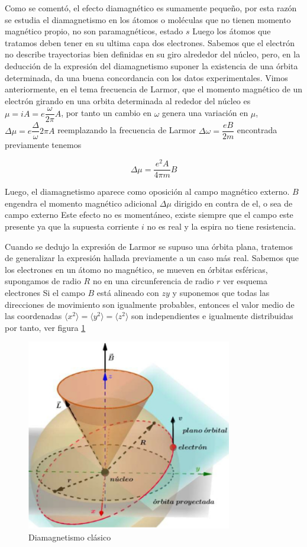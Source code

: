 Como se comentó, el efecto diamagnético es sumamente pequeño, por esta razón se estudia el diamagnetismo en los átomos o moléculas que no tienen momento magnético propio, no son paramagnéticos, estado $s$ Luego los átomos que tratamos deben tener en su ultima capa dos electrones. Sabemos que el electrón no describe trayectorias bien definidas en su giro alrededor del núcleo, pero, en la deducción de la expresión del diamagnetismo suponer la existencia de una órbita determinada, da una buena concordancia con los datos experimentales. Vimos anteriormente, en el tema frecuencia de Larmor, que el momento magnético de un electrón girando en una orbita determinada al rededor del núcleo es $\mu=iA= e\dfrac{\omega}{2\pi}A$, por tanto un cambio en $\omega$ genera una variación en $\mu$, $\Delta\mu=e\dfrac{\Delta}\omega{2\pi}A$ reemplazando la frecuencia de Larmor $\Delta\omega=\dfrac{eB}{2m}$ encontrada previamente tenemos

\begin{equation*}
	\Delta\mu=\dfrac{e^{2}A}{4\pi m}B
\end{equation*}

Luego, el diamagnetismo aparece como oposición al campo magnético externo. $B$ engendra el momento magnético adicional $\Delta\mu$ dirigido en contra de el, o sea de campo externo Este efecto no es momentáneo, existe siempre que el campo este presente ya que la supuesta corriente $i$ no es real y la espira no tiene resistencia.

Cuando se dedujo la expresión de Larmor se supuso una órbita plana, tratemos de generalizar la expresión hallada previamente a un caso más real. Sabemos que los electrones en un átomo no magnético, se mueven en órbitas esféricas, supongamos de radio $R$ no en una circunferencia de radio $r$ ver esquema electrones Si el campo $B$ está alineado con $zy$ y suponemos que todas las direcciones de movimiento son igualmente probables, entonces el valor medio de las coordenadas $\langle x^{2}\rangle=\langle y^{2} \rangle =\langle z^{2} \rangle$ son independientes e igualmente distribuidas por tanto, ver figura \ref{fig:s17}


\begin{figure}[H]
    \centering
    \includegraphics[width=0.8\textwidth]{./Figures/fig_s17}
	\caption{Diamagnetismo clásico}
	\label{fig:s17}
\end{figure}

